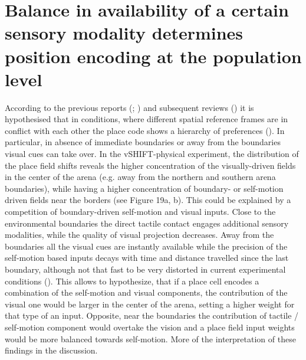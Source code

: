 \section{Balance in availability of a certain sensory modality determines position encoding at the population level}
\label{sec:balance_sm_vs_vision}

According to the previous reports (\cite{Mcnaughton1996}; \cite{Gothard2001}) and subsequent reviews (\cite{Maaswinkel1999}) it is hypothesised that in conditions, where different spatial reference frames are in conflict with each other the place code shows a hierarchy of preferences (\cite{Maaswinkel1999}). In particular, in absence of immediate boundaries or away from the boundaries visual cues can take over. In the vSHIFT-physical experiment, the distribution of the place field shifts reveals the higher concentration of the visually-driven fields in the center of the arena (e.g. away from the northern and southern arena boundaries), while having a higher concentration of boundary- or self-motion driven fields near the borders (see Figure 19a, b). This could be explained by a competition of boundary-driven self-motion and visual inputs. Close to the environmental boundaries the direct tactile contact engages additional sensory modalities, while the quality of visual projection decreases. Away from the boundaries all the visual cues are instantly available while the precision of the self-motion based inputs decays with time and distance travelled since the last boundary, although not that fast to be very distorted in current experimental conditions (\cite{Hardcastle2015}). This allows to hypothesize, that if a place cell encodes a combination of the self-motion and visual components, the contribution of the visual one would be larger in the center of the arena, setting a higher weight for that type of an input. Opposite, near the boundaries the contribution of tactile / self-motion component would overtake the vision and a place field input weights would be more balanced towards self-motion. More of the interpretation of these findings in the discussion.


